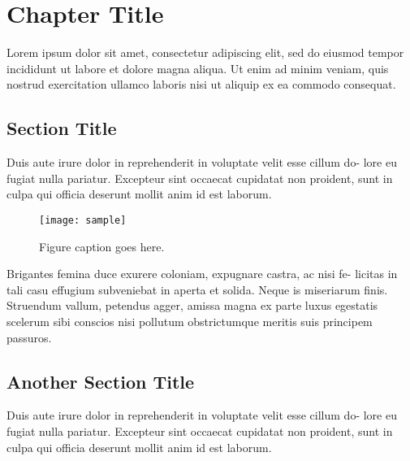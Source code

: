 \chapter{Chapter Title}

Lorem ipsum dolor sit amet, consectetur adipiscing elit, sed do eiusmod tempor incididunt ut labore et dolore magna aliqua. Ut enim ad minim veniam, quis nostrud exercitation ullamco laboris nisi ut aliquip ex ea commodo consequat.

\section{Section Title}

Duis aute irure dolor in reprehenderit in voluptate velit esse cillum do- lore eu fugiat nulla pariatur. Excepteur sint occaecat cupidatat non proident, sunt in culpa qui officia deserunt mollit anim id est laborum.

\begin{figure}
    \centering
    \texttt{[image: sample]}
    \caption[Sample figure description]{Figure caption goes here.}
    \label{fig:s1}
\end{figure}

Brigantes femina duce exurere coloniam, expugnare castra, ac nisi fe- licitas in tali casu effugium subveniebat in aperta et solida. Neque is miseriarum finis. Struendum vallum, petendus agger, amissa magna ex parte luxus egestatis scelerum sibi conscios nisi pollutum obstrictumque meritis suis principem passuros.

\section{Another Section Title}

Duis aute irure dolor in reprehenderit in voluptate velit esse cillum do- lore eu fugiat nulla pariatur. Excepteur sint occaecat cupidatat non proident, sunt in culpa qui officia deserunt mollit anim id est laborum.

